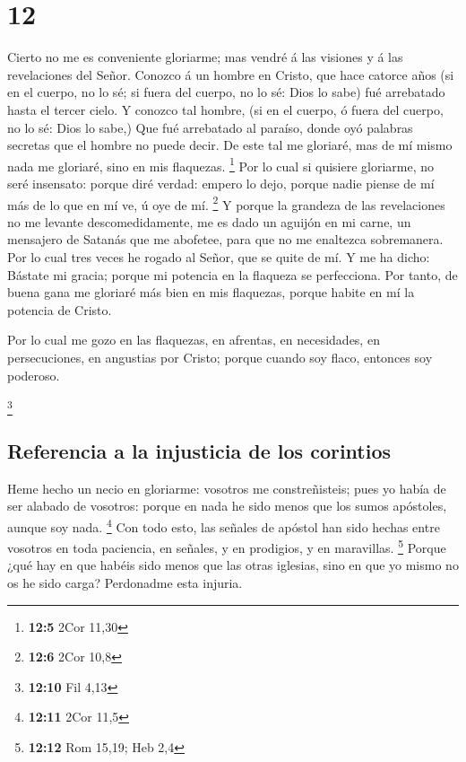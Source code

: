 \hypertarget{section-11}{%
\section{12}\label{section-11}}

 Cierto no me es conveniente gloriarme; mas vendré á las
visiones y á las revelaciones del Señor.  Conozco á un
hombre en Cristo, que hace catorce años (si en el cuerpo, no lo sé; si
fuera del cuerpo, no lo sé: Dios lo sabe) fué arrebatado hasta el tercer
cielo.  Y conozco tal hombre, (si en el cuerpo, ó fuera
del cuerpo, no lo sé: Dios lo sabe,)  Que fué arrebatado
al paraíso, donde oyó palabras secretas que el hombre no puede decir.
 De este tal me gloriaré, mas de mí mismo nada me
gloriaré, sino en mis flaquezas. \footnote{\textbf{12:5} 2Cor 11,30}
 Por lo cual si quisiere gloriarme, no seré insensato:
porque diré verdad: empero lo dejo, porque nadie piense de mí más de lo
que en mí ve, ú oye de mí. \footnote{\textbf{12:6} 2Cor 10,8}
 Y porque la grandeza de las revelaciones no me levante
descomedidamente, me es dado un aguijón en mi carne, un mensajero de
Satanás que me abofetee, para que no me enaltezca sobremanera.
 Por lo cual tres veces he rogado al Señor, que se quite
de mí.  Y me ha dicho: Bástate mi gracia; porque mi
potencia en la flaqueza se perfecciona. Por tanto, de buena gana me
gloriaré más bien en mis flaquezas, porque habite en mí la potencia de
Cristo.

 Por lo cual me gozo en las flaquezas, en afrentas, en
necesidades, en persecuciones, en angustias por Cristo; porque cuando
soy flaco, entonces soy poderoso.

\footnote{\textbf{12:10} Fil 4,13}

\hypertarget{referencia-a-la-injusticia-de-los-corintios}{%
\subsection{Referencia a la injusticia de los
corintios}\label{referencia-a-la-injusticia-de-los-corintios}}

 Heme hecho un necio en gloriarme: vosotros me
constreñisteis; pues yo había de ser alabado de vosotros: porque en nada
he sido menos que los sumos apóstoles, aunque soy nada. \footnote{\textbf{12:11}
  2Cor 11,5}  Con todo esto, las señales de apóstol han
sido hechas entre vosotros en toda paciencia, en señales, y en
prodigios, y en maravillas. \footnote{\textbf{12:12} Rom 15,19; Heb 2,4}
 Porque ¿qué hay en que habéis sido menos que las otras
iglesias, sino en que yo mismo no os he sido carga? Perdonadme esta
injuria.

